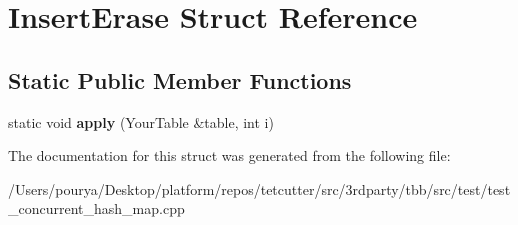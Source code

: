 \hypertarget{structInsertErase}{}\section{Insert\+Erase Struct Reference}
\label{structInsertErase}
\subsection*{Static Public Member Functions}
\begin{DoxyCompactItemize}
\item 
\hypertarget{structInsertErase_abfee4d4e9b64c4fb3e8e1cd4264f441b}{}static void {\bfseries apply} (Your\+Table \&table, int i)\label{structInsertErase_abfee4d4e9b64c4fb3e8e1cd4264f441b}

\end{DoxyCompactItemize}


The documentation for this struct was generated from the following file\+:\begin{DoxyCompactItemize}
\item 
/\+Users/pourya/\+Desktop/platform/repos/tetcutter/src/3rdparty/tbb/src/test/test\+\_\+concurrent\+\_\+hash\+\_\+map.\+cpp\end{DoxyCompactItemize}
